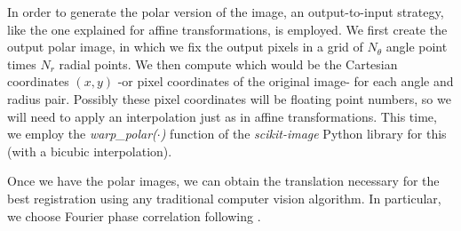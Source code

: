 \documentclass[11pt, a4paper, twoside]{article} %
\begin{document}
In order to generate the polar version of the image, an output-to-input strategy, like the one explained for affine transformations, is employed. We first create the output polar image, in which we fix the output pixels in a grid of $N_\theta$ angle point times $N_r$ radial points. We then compute which would be the Cartesian coordinates $(x,y)$ -or pixel coordinates of the original image- for each angle and radius pair. Possibly these pixel coordinates will be floating point numbers, so we will need to apply an interpolation just as in affine transformations. This time, we employ the {\em warp\_polar($\cdot$)} function of the {\em scikit-image} Python library \cite{skimage} for this (with a bicubic interpolation).

Once we have the polar images, we can obtain the translation necessary for the best registration using any traditional computer vision algorithm. In particular, we choose Fourier phase correlation following \cite{phase,phase2}.\vspace{-0.15cm}
\end{document}
